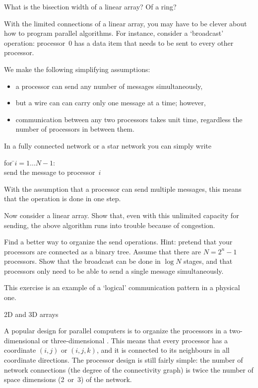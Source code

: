 \begin{exercise}
  What is the bisection width of a linear array? Of a ring?
\end{exercise}

\begin{exercise}
  With the limited connections of a linear array, you may have to be
  clever about how to program parallel algorithms. For instance,
  consider a `broadcast' operation: processor~$0$ has a data item that
  needs to be sent to every other processor. 

  We make the following simplifying assumptions:
  \begin{itemize}
  \item a processor can send any number of messages simultaneously,
  \item but a wire can can carry only one message at a time; however,
    \item communication between any two processors takes unit time,
      regardless the number of processors in between them.
  \end{itemize}

  In a fully connected network or a star network
  you can simply write
  \begin{tabbing}
    for \=$i=1\ldots N-1$:\\ \>send the message to processor~$i$
  \end{tabbing}
  With the assumption that a processor can send multiple messages,
  this means that the operation is done in one step.

  Now consider a linear array. Show that, even with this unlimited capacity for
  sending, the above algorithm runs into trouble because of congestion.

  Find a better way to organize the send operations. Hint: pretend
  that your processors are connected as a binary tree. Assume that
  there are $N=2^n-1$ processors.
  Show that the broadcast can be done in $\log N$ stages, and that
  processors only need to be able to send a single message simultaneously.
\end{exercise}
This exercise is an example of  a
`logical' communication pattern in a physical one.

 {2D and 3D arrays}

A popular design for parallel computers is to organize the processors
in a two-dimensional or three-dimensional .
This means that every processor has a coordinate $(i,j)$ or $(i,j,k)$,
and it is connected to its neighbours in all coordinate directions.
The processor design is still fairly simple: the number of network
connections (the degree of the connectivity graph) is twice the number
of space dimensions (2~or~3) of the network.


